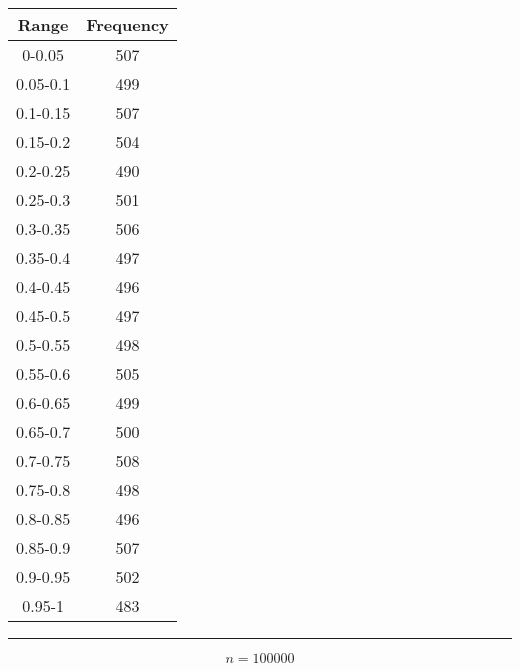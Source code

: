\documentclass{article}
\begin{document}
\begin{center} \begin{tabular}{||c | c||}  \hline
		Range & Frequency \\ [0.5ex] \hline \hline0-0.05 & 507\\
		\hline 
		0.05-0.1 & 499\\
		\hline 
		0.1-0.15 & 507\\
		\hline 
		0.15-0.2 & 504\\
		\hline 
		0.2-0.25 & 490\\
		\hline 
		0.25-0.3 & 501\\
		\hline 
		0.3-0.35 & 506\\
		\hline 
		0.35-0.4 & 497\\
		\hline 
		0.4-0.45 & 496\\
		\hline 
		0.45-0.5 & 497\\
		\hline 
		0.5-0.55 & 498\\
		\hline 
		0.55-0.6 & 505\\
		\hline 
		0.6-0.65 & 499\\
		\hline 
		0.65-0.7 & 500\\
		\hline 
		0.7-0.75 & 508\\
		\hline 
		0.75-0.8 & 498\\
		\hline 
		0.8-0.85 & 496\\
		\hline 
		0.85-0.9 & 507\\
		\hline 
		0.9-0.95 & 502\\
		\hline 
		0.95-1 & 483\\
		\hline 
	\end{tabular} 
\end{center}

\pagebreak

\begin {figure}
\begin{center}
	
\end{center}
\end {figure}
\noindent\rule[0.5ex]{\linewidth}{1pt}


$$n= 100000$$
\end{document}
